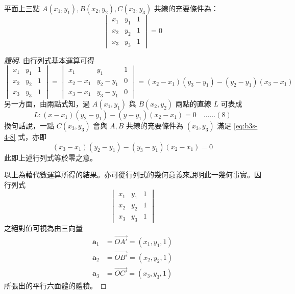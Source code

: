 \begin{example}[論例 3]
平面上三點 $A(x_1, y_1), B(x_2, y_2), C(x_3, y_3)$ 共線的充要條件為：
\[ \begin{vmatrix} x_1 & y_1 & 1 \\ x_2 & y_2 & 1 \\ x_3 & y_3 & 1 \end{vmatrix} = 0 \]
\end{example}

\begin{proof}[證明]
由行列式基本運算可得
\[ \begin{vmatrix} x_1 & y_1 & 1 \\ x_2 & y_2 & 1 \\ x_3 & y_3 & 1 \end{vmatrix} = \begin{vmatrix} x_1 & y_1 & 1 \\ x_2 - x_1 & y_2 - y_1 & 0 \\ x_3 - x_1 & y_3 - y_1 & 0 \end{vmatrix} = (x_2 - x_1)(y_3 - y_1) - (y_2 - y_1)(x_3 - x_1) \]
另一方面，由兩點式知，過 $A(x_1, y_1)$ 與 $B(x_2, y_2)$ 兩點的直線 $L$ 可表成
\[ L : (x - x_1)(y_2 - y_1) - (y - y_1)(x_2 - x_1) = 0 \quad\dots\dots (8) \]
換句話說，一點 $C(x_3, y_3)$ 會與 $A, B$ 共線的充要條件為 $(x_3, y_3)$ 滿足 \eqref{eq:b3s-4-8} 式，亦即
\[ (x_3 - x_1)(y_2 - y_1) - (y_3 - y_1)(x_2 - x_1) = 0 \]
此即上述行列式等於零之意。

以上為藉代數運算所得的結果。亦可從行列式的幾何意義來說明此一幾何事實。因行列式
\[ \begin{vmatrix} x_1 & y_1 & 1 \\ x_2 & y_2 & 1 \\ x_3 & y_3 & 1 \end{vmatrix} \]
之絕對值可視為由三向量
\begin{align*}
\mathbf{a}_1 &= \vec{OA'} = (x_1, y_1, 1) \\
\mathbf{a}_2 &= \vec{OB'} = (x_2, y_2, 1) \\
\mathbf{a}_3 &= \vec{OC'} = (x_3, y_3, 1)
\end{align*}
所張出的平行六面體的體積。
\end{proof}

